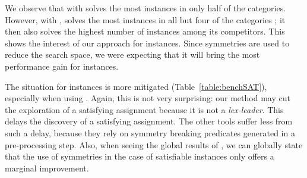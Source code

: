 We observe that \cdclsym{} with \saucy{} solves the most instances in only half
of the \unsat categories. However, with \bliss{}, \cdclsym{} solves the most
instances in all but four of the \unsat categories ; it then also solves the
highest number of instances among its competitors. This shows the interest
of our approach for \unsat instances. Since symmetries are used to reduce the
search space, we were expecting that it will bring the most performance gain
for \unsat instances.

The situation for \sat instances is more mitigated (Table~\ref{table:benchSAT}),
especially when using \saucy{}. Again, this is not very surprising: our method
may cut the exploration of a satisfying assignment because it is not a
\textit{lex-leader}. This delays the discovery of a satisfying assignment. The
other tools suffer less from such a delay, because they rely on symmetry
breaking predicates generated in a pre-processing step. Also, when seeing the
global results of \minisat{}, we can globally state that the use of symmetries
in the case of satisfiable instances only offers a marginal improvement.

